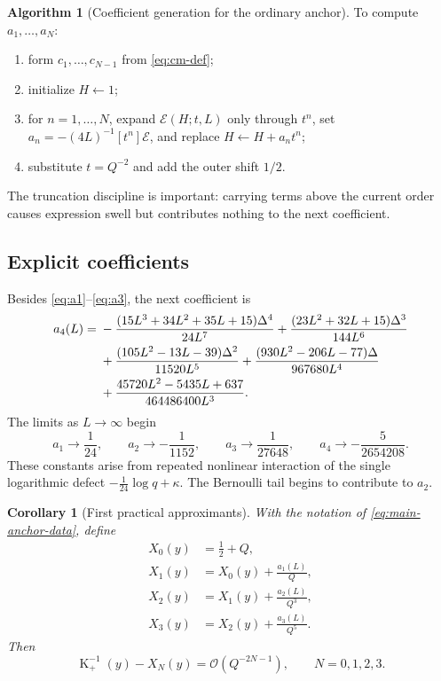 \documentclass[11pt,oneside]{article}
\theoremstyle{plain}
\newtheorem{corollary}[theorem]{Corollary}
\theoremstyle{definition}
\newtheorem{algorithm}[theorem]{Algorithm}
\theoremstyle{remark}
\newcommand{\Kfun}{\operatorname{K}}
\newcommand{\BigO}{\mathcal{O}}
\newcommand{\calE}{\mathcal{E}}
\begin{document}
\begin{algorithm}[Coefficient generation for the ordinary anchor]
\label{alg:ordinary-coefficients}
To compute \(a_1,\ldots,a_N\):
\begin{enumerate}
\item form \(c_1,\ldots,c_{N-1}\) from \eqref{eq:cm-def};
\item initialize \(H\leftarrow1\);
\item for \(n=1,\ldots,N\), expand \(\calE(H;t,L)\) only through \(t^n\),
      set \(a_n=-(4L)^{-1}[t^n]\calE\), and replace
      \(H\leftarrow H+a_nt^n\);
\item substitute \(t=Q^{-2}\) and add the outer shift \(1/2\).
\end{enumerate}
The truncation discipline is important: carrying terms above the current order
causes expression swell but contributes nothing to the next coefficient.
\end{algorithm}

\subsection{Explicit coefficients}

Besides \eqref{eq:a1}--\eqref{eq:a3}, the next coefficient is
\begin{align}
 a_4(L)={}&
 -\frac{(15L^3+34L^2+35L+15)\Delta^4}{24L^7}
 +\frac{(23L^2+32L+15)\Delta^3}{144L^6}
 \notag\\
 &+\frac{(105L^2-13L-39)\Delta^2}{11520L^5}
 +\frac{(930L^2-206L-77)\Delta}{967680L^4}
 \notag\\
 &+\frac{45720L^2-5435L+637}{464486400L^3}.
 \label{eq:a4}
\end{align}
The limits as \(L\to\infty\) begin
\begin{equation}
 a_1\to\frac1{24},\qquad
 a_2\to-\frac1{1152},\qquad
 a_3\to\frac1{27648},\qquad
 a_4\to-\frac5{2654208}.
 \label{eq:an-limits}
\end{equation}
These constants arise from repeated nonlinear interaction of the single
logarithmic defect \(-\tfrac1{24}\log q+\kappa\).  The Bernoulli tail begins to
contribute to \(a_2\).

\begin{corollary}[First practical approximants]
\label{cor:ordinary-practical}
With the notation of \eqref{eq:main-anchor-data}, define
\begin{align*}
 X_0(y)&=\frac12+Q,\\
 X_1(y)&=X_0(y)+\frac{a_1(L)}{Q},\\
 X_2(y)&=X_1(y)+\frac{a_2(L)}{Q^3},\\
 X_3(y)&=X_2(y)+\frac{a_3(L)}{Q^5}.
\end{align*}
Then
\begin{equation}
 \Kfun_+^{-1}(y)-X_N(y)=\BigO\!\left(Q^{-2N-1}\right),
 \qquad N=0,1,2,3.
 \label{eq:ordinary-practical-error}
\end{equation}
\end{corollary}
\end{document}
